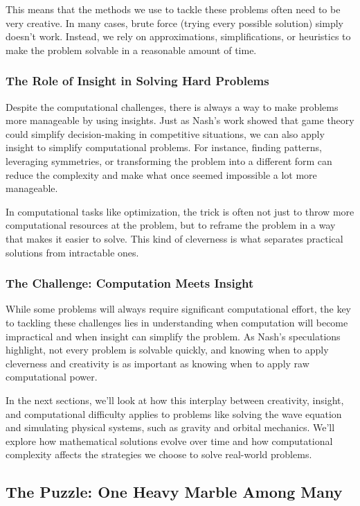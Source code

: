 This means that the methods we use to tackle these problems often need to be very creative. In many cases, brute force (trying every possible solution) simply doesn’t work. Instead, we rely on approximations, simplifications, or heuristics to make the problem solvable in a reasonable amount of time.

\subsubsection{The Role of Insight in Solving Hard Problems}

Despite the computational challenges, there is always a way to make problems more manageable by using insights. Just as Nash’s work showed that game theory could simplify decision-making in competitive situations, we can also apply insight to simplify computational problems. For instance, finding patterns, leveraging symmetries, or transforming the problem into a different form can reduce the complexity and make what once seemed impossible a lot more manageable.

In computational tasks like optimization, the trick is often not just to throw more computational resources at the problem, but to reframe the problem in a way that makes it easier to solve. This kind of cleverness is what separates practical solutions from intractable ones.

\subsubsection{The Challenge: Computation Meets Insight}

While some problems will always require significant computational effort, the key to tackling these challenges lies in understanding when computation will become impractical and when insight can simplify the problem. As Nash’s speculations highlight, not every problem is solvable quickly, and knowing when to apply cleverness and creativity is as important as knowing when to apply raw computational power.

In the next sections, we’ll look at how this interplay between creativity, insight, and computational difficulty applies to problems like solving the wave equation and simulating physical systems, such as gravity and orbital mechanics. We’ll explore how mathematical solutions evolve over time and how computational complexity affects the strategies we choose to solve real-world problems.

\subsection{The Puzzle: One Heavy Marble Among Many}

